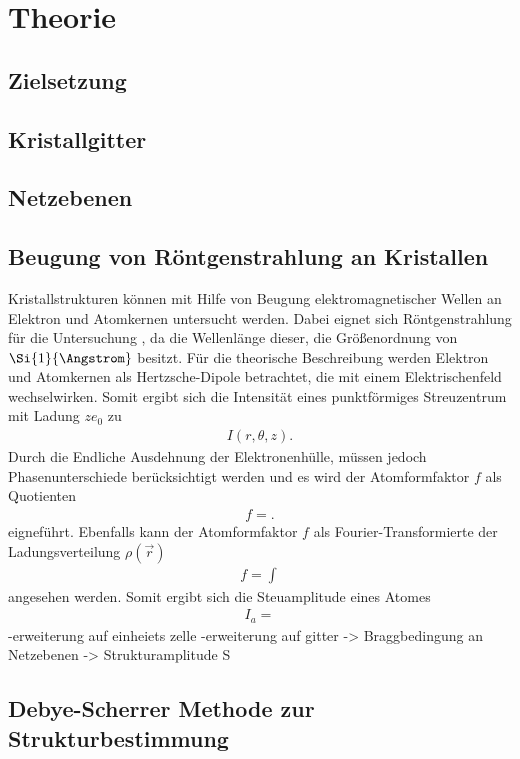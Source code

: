 \section{Theorie}
\label{sec:Theorie}

\subsection{Zielsetzung}
\label{subsec:Zielsetzung}

\subsection{Kristallgitter}
\label{subsec:kristallstrukturen}

\subsection{Netzebenen}
\label{subsec:netzebenen}

\subsection{Beugung von Röntgenstrahlung an Kristallen}
\label{subsec:Beugung}
Kristallstrukturen können mit Hilfe von Beugung
elektromagnetischer Wellen an Elektron und Atomkernen untersucht werden.
Dabei eignet sich Röntgenstrahlung für die Untersuchung
, da die Wellenlänge dieser, die Größenordnung
von $\Si{1}{\Angstrom}$ besitzt.
Für die theorische Beschreibung werden Elektron und Atomkernen
als Hertzsche-Dipole betrachtet, die mit einem
Elektrischenfeld wechselwirken.
Somit ergibt sich die Intensität eines punktförmiges Streuzentrum mit
Ladung $ze_0$ zu
\begin{align}
  I(r,\theta,z)  \label{6}.
\end{align}
Durch die Endliche Ausdehnung der Elektronenhülle,
müssen jedoch Phasenunterschiede
berücksichtigt werden und es wird
der Atomformfaktor $f$ als Quotienten
\begin{align}
f=.
\end{align}
eigneführt.
Ebenfalls kann der Atomformfaktor $f$ als Fourier-Transformierte
der Ladungsverteilung $\rho(\vec{r})$
\begin{align}
f=\int
\end{align}
 angesehen werden.
Somit ergibt sich die Steuamplitude eines Atomes
\begin{align}
  I_a=
\end{align}
-erweiterung auf einheiets zelle
-erweiterung auf gitter
-> Braggbedingung an Netzebenen
-> Strukturamplitude S





\subsection{Debye-Scherrer Methode zur Strukturbestimmung}
\label{subsec:Methoden}

\cite{sample}
